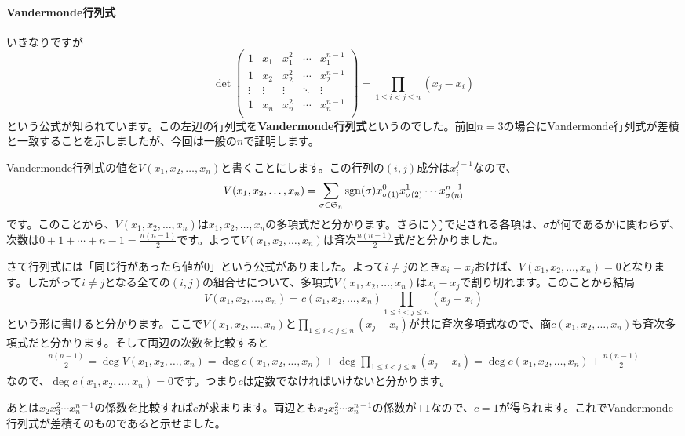\paragraph{Vandermonde行列式}
いきなりですが
\[
\det
\begin{pmatrix}
1 & x_1 & x_1^2 & \cdots & x_1^{n - 1} \\
1 & x_2 & x_2^2 & \cdots & x_2^{n - 1} \\
\vdots & \vdots & \vdots & \ddots & \vdots \\
1 & x_n & x_n^2 & \cdots & x_n^{n - 1} \\
\end{pmatrix}
=
\prod_{1 \leq i < j \leq n}(x_j - x_i)
\]
という公式が知られています。この左辺の行列式を\textbf{Vandermonde行列式}というのでした。前回$n = 3$の場合にVandermonde行列式が差積と一致することを示しましたが、今回は一般の$n$で証明します。

Vandermonde行列式の値を$V(x_1, x_2, \ldots, x_n)$と書くことにします。この行列の$(i, j)$成分は$x_i^{j -1}$なので、
\[
V(x_1, x_2, \ldots, x_n) =
\sum_{\sigma \in \mathfrak{S}_n} \operatorname{sgn}(\sigma) x_{\sigma(1)}^{0} x_{\sigma(2)}^{1} \cdots x_{\sigma(n)}^{n - 1}
\]
です。このことから、$V(x_1, x_2, \ldots, x_n)$は$x_1, x_2, \ldots, x_n$の多項式だと分かります。さらに$\sum$で足される各項は、$\sigma$が何であるかに関わらず、次数は$0 + 1 + \cdots + n - 1 = \frac{n(n - 1)}{2}$です。よって$V(x_1, x_2, \ldots, x_n)$は斉次$\frac{n(n - 1)}{2}$式だと分かりました。

さて行列式には「同じ行があったら値が$0$」という公式がありました。よって$i \neq j$のとき$x_i = x_j$おけば、$V(x_1, x_2, \ldots, x_n) = 0$となります。したがって$i \neq j$となる全ての$(i, j)$の組合せについて、多項式$V(x_1, x_2, \ldots, x_n)$は$x_i - x_j$で割り切れます。このことから結局
\[
V(x_1, x_2, \ldots, x_n) = c(x_1, x_2, \ldots, x_n) \prod_{1\leq i < j\leq n} (x_j - x_i)
\]
という形に書けると分かります。ここで$V(x_1, x_2, \ldots, x_n)$と$\prod_{1\leq i < j\leq n} (x_j - x_i)$が共に斉次多項式なので、商$c(x_1, x_2, \ldots, x_n)$も斉次多項式だと分かります。そして両辺の次数を比較すると
\begin{align*}
\frac{n(n - 1)}{2} = \deg V(x_1, x_2, \ldots, x_n) = \deg c(x_1, x_2, \ldots, x_n) + \deg \prod_{1 \leq i < j \leq n} (x_j - x_i)
= \deg c(x_1, x_2, \ldots, x_n) + \frac{n(n - 1)}{2}
\end{align*}
なので、$\deg c(x_1, x_2, \ldots, x_n) = 0$です。つまり$c$は定数でなければいけないと分かります。

あとは$x_2 x_3^2 \cdots x_n^{n -1}$の係数を比較すれば$c$が求まります。両辺とも$x_2 x_3^2 \cdots x_n^{n - 1}$の係数が$+1$なので、$c = 1$が得られます。これでVandermonde行列式が差積そのものであると示せました。

